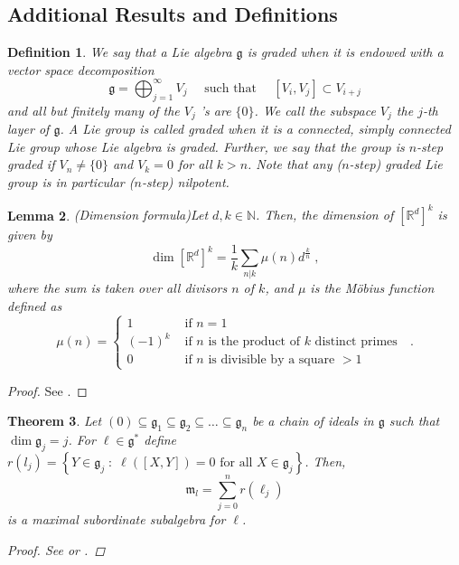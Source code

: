 \documentclass[pdflatex,sn-mathphys-num]{sn-jnl}
\theoremstyle{thmstyletwo}
\newtheorem{definition}{Definition}[section]
\theoremstyle{thmstyleone}
\newtheorem{theorem}[definition]{Theorem}
\newtheorem{lemma}[definition]{Lemma}
\theoremstyle{thmstyletwo}
\newcommand{\fancyg}{\mathfrak{g}}
\newcommand{\fancym}{\mathfrak{m}}
\begin{document}
		\newpage
		\begin{appendices}
			\section{}\label{secA1}
			\subsection{Additional Results and Definitions}
			\begin{definition}\label{def: graded}
				We say that a Lie algebra $\mathfrak{g}$ is graded when it is endowed with a vector space decomposition
				$$
				\mathfrak{g}=\bigoplus_{j=1}^{\infty} V_j \quad \text { such that } \quad\left[V_i, V_j\right] \subset V_{i+j}
				$$
				and all but finitely many of the $V_j$ 's are $\{0\}$. We call the subspace $V_j$ the $j$-th layer of $\fancyg$. A Lie group is called graded when it is a connected, simply connected Lie group whose Lie algebra is graded. Further, we say that the group is $n$-step graded if $V_n \neq \{0\}$ and $V_k = 0$ for all $k>n$. Note that any ($n$-step) graded Lie group is in particular ($n$-step) nilpotent.
			\end{definition}
			\begin{lemma}{(Dimension formula)}\label{lem: dimension formula}
				Let $d, k \in \mathbb{N}$. Then, the dimension of $[\mathbb{R}^d]^k$ is given by 
				\[\operatorname{dim}[\mathbb{R}^d]^k = \frac{1}{k}\sum_{n|k}\mu(n)d^{\frac{k}{n}} \;,\]
				where the sum is taken over all divisors $n$ of $k$, and $\mu$ is the Möbius function defined as
				\[\mu(n)= \begin{cases}1 & \text { if } n=1 \\ (-1)^k & \text { if } n \text { is the product of } k \text { distinct primes } \\ 0 & \text { if } n \text { is divisible by a square }>1\end{cases} \;.\]
			\end{lemma}
			\begin{proof}
				See \cite{witt1937treue}.
			\end{proof}
			\begin{theorem}\label{thm: vergne}
				Let $(0) \subseteq \fancyg_1 \subseteq \fancyg_2 \subseteq \ldots \subseteq \fancyg_n$ be a chain of ideals in $\fancyg$ such that $\dim \fancyg_j = j$. For $\ell \in \fancyg^*$ define $r({l_j}) = \left\{Y \in \fancyg_j \; : \; \ell([X,Y]) = 0 \text{ for all } X \in \fancyg_j\right\}$. Then, $$\fancym_l = \sum_{j = 0}^n r(\ell_j)$$
				is a maximal subordinate subalgebra for $\ell$.
				\begin{proof}
					See \cite{vergne1971} or \cite[Theorem~1.3.5]{corwin1990representations}.
				\end{proof}
			\end{theorem}

\end{appendices}
\end{document}
